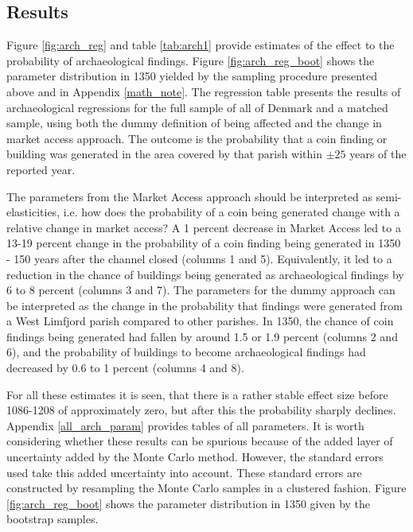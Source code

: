 \documentclass[12pt]{article}
\begin{document}
\FloatBarrier
\subsection{Results}
Figure \ref{fig:arch_reg} and table \ref{tab:arch1} provide estimates of the effect to the probability of archaeological findings. Figure \ref{fig:arch_reg_boot} shows the parameter distribution in 1350 yielded by the sampling procedure presented above and in Appendix \ref{math_note}. The regression table presents the results of archaeological regressions for the full sample of all of Denmark and a matched sample, using both the dummy definition of being affected and the change in market access approach. The outcome is the probability that a coin finding or building was generated in the area covered by that parish within $\pm 25$ years of the reported year. 

The parameters from the Market Access approach should be interpreted as semi-elasticities, i.e. how does the probability of a coin being generated change with a relative change in market access? A 1 percent decrease in Market Access led to a 13-19 percent change in the probability of a coin finding being generated in 1350 - 150 years after the channel closed (columns 1 and 5). Equivalently, it led to a reduction in the chance of buildings being generated as archaeological findings by 6 to 8 percent (columns 3 and 7). The parameters for the dummy approach can be interpreted as the change in the probability that findings were generated from a West Limfjord parish compared to other parishes. In 1350, the chance of coin findings being generated had fallen by around 1.5 or 1.9 percent  (columns 2 and 6), and the probability of buildings to become archaeological findings had decreased by 0.6 to 1 percent (columns 4 and 8). 

For all these estimates it is seen, that there is a rather stable effect size before 1086-1208 of approximately zero, but after this the probability sharply declines. Appendix \ref{all_arch_param} provides tables of all parameters. It is worth considering whether these results can be spurious because of the added layer of uncertainty added by the Monte Carlo method. However, the standard errors used take this added uncertainty into account. These standard errors are constructed by resampling the Monte Carlo samples in a clustered fashion. Figure \ref{fig:arch_reg_boot} shows the parameter distribution in 1350 given by the bootstrap samples.
\end{document}
